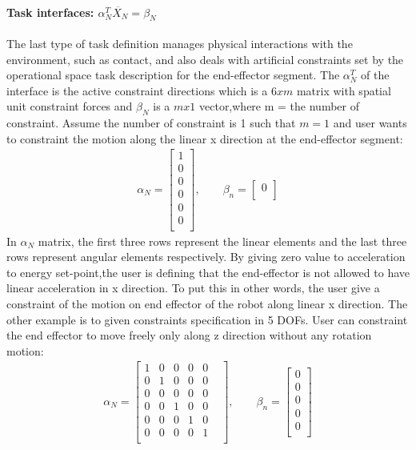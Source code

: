 \documentclass[report.tex]{subfiles}
\begin{document}
    \paragraph*{\large{Task interfaces: $\alpha_N^T \ddot{X_N} = \beta_N$}\\} The last type of task definition manages physical interactions with the environment, such as contact, and also deals with artificial constraints set by the operational space task description for the end-effector segment. The $\alpha_N^T$ of the interface is the active constraint directions which is a $6 x m$ matrix with spatial unit constraint forces and $\beta_N$ is a $m x 1$ vector,where m = the number of constraint.
    Assume the number of constraint is 1 such that $m = 1$ and user wants to constraint the motion along the linear x direction at the end-effector segment:
    \begin{align}
        \alpha_N = \begin{bmatrix}
            1\\
            0\\
            0\\
            0\\
            0\\
            0\\ 
        \end{bmatrix} ,\qquad
        \beta_n = \begin{bmatrix}
            0\\ 
        \end{bmatrix}
    \end{align}
    In $\alpha_N$ matrix, the first three rows represent the linear elements and the last three rows represent angular elements respectively. By giving zero value to acceleration to energy set-point,the user is defining that the end-effector is not allowed to have linear acceleration in x direction. To put this in other words, the user give a constraint of the motion on end effector of the robot along linear x direction.
    The other example is to given constraints specification in 5 DOFs. User can constraint the end effector to move freely only along z direction without any rotation motion:   
    \begin{align}
        \alpha_N = \begin{bmatrix}
            1&0&0&0&0&\\
            0&1&0&0&0&\\
            0&0&0&0&0&\\
            0&0&1&0&0&\\
            0&0&0&1&0&\\
            0&0&0&0&1&\\ 
        \end{bmatrix} ,\qquad
        \beta_n = \begin{bmatrix}
            0\\
            0\\
            0\\
            0\\
            0\\ 
        \end{bmatrix}
    \end{align}
\end{document}
